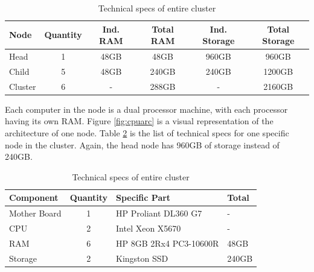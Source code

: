 \documentclass[12pt]{article}
\begin{document}
\begin{table} [H]
    \centering
    \begin{tabular}{l|c|c|c|c|c}
        Node & Quantity & Ind. RAM & Total RAM & Ind. Storage & Total Storage\\
        \hline
        Head & 1 & 48GB & 48GB & 960GB & 960GB \\
        Child & 5 & 48GB & 240GB & 240GB & 1200GB\\
        \hline
        Cluster & 6 & - & 288GB & - & 2160GB\\
    \end{tabular}
    \caption{Technical specs of entire cluster}
    \label{tab:clusterspecs}
\end{table}

Each computer in the node is a dual processor machine, with each processor having its own RAM. Figure \ref{fig:cpuarc} is a visual representation of the architecture of one node. Table \ref{tab:nodespecs} is the list of technical specs for one specific node in the cluster. Again, the head node has 960GB of storage instead of 240GB. 

\begin{table} [H]
    \centering
    \begin{tabular}{l c l|l}
        Component & Quantity & Specific Part & Total\\
        \hline
        Mother Board & 1 & HP Proliant DL360 G7 & -\\
        CPU & 2 & Intel Xeon X5670 & -\\
        RAM & 6 & HP 8GB 2Rx4 PC3-10600R & 48GB\\
        Storage & 2 & Kingston SSD & 240GB\\
    \end{tabular}
    \caption{Technical specs of entire cluster}
    \label{tab:nodespecs}
\end{table}
\end{document}
